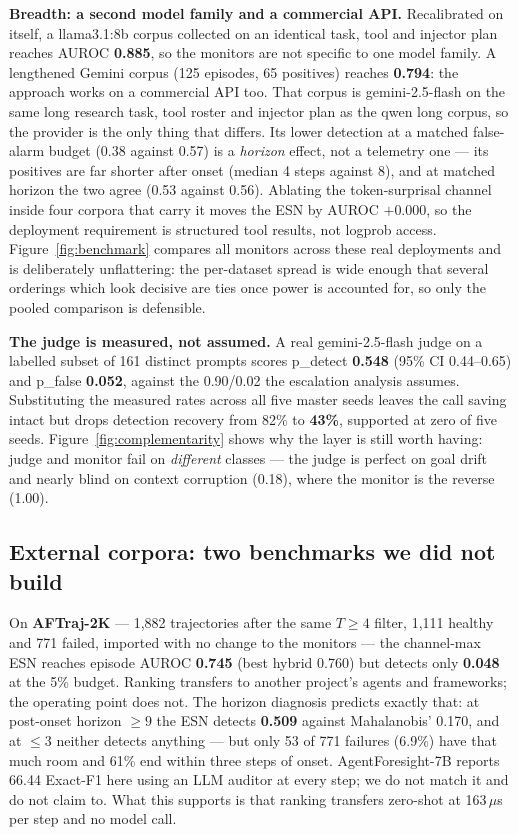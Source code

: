 \documentclass{article}
\begin{document}
\textbf{Breadth: a second model family and a commercial API.} Recalibrated on itself, a llama3.1:8b corpus collected on an identical task, tool and injector plan reaches AUROC \textbf{0.885}, so the monitors are not specific to one model family. A lengthened Gemini corpus (125 episodes, 65 positives) reaches \textbf{0.794}: the approach works on a commercial API too. That corpus is gemini-2.5-flash on the same long research task, tool roster and injector plan as the qwen long corpus, so the provider is the only thing that differs. Its lower detection at a matched false-alarm budget (0.38 against 0.57) is a \emph{horizon} effect, not a telemetry one --- its positives are far shorter after onset (median 4 steps against 8), and at matched horizon the two agree (0.53 against 0.56). Ablating the token-surprisal channel inside four corpora that carry it moves the ESN by AUROC $+0.000$, so the deployment requirement is structured tool results, not logprob access. Figure~\ref{fig:benchmark} compares all monitors across these real deployments and is deliberately unflattering: the per-dataset spread is wide enough that several orderings which look decisive are ties once power is accounted for, so only the pooled comparison is defensible.

\textbf{The judge is measured, not assumed.} A real gemini-2.5-flash judge on a labelled subset of 161 distinct prompts scores p\_detect \textbf{0.548} (95\% CI 0.44--0.65) and p\_false \textbf{0.052}, against the 0.90/0.02 the escalation analysis assumes. Substituting the measured rates across all five master seeds leaves the call saving intact but drops detection recovery from 82\% to \textbf{43\%}, supported at zero of five seeds. Figure~\ref{fig:complementarity} shows why the layer is still worth having: judge and monitor fail on \emph{different} classes --- the judge is perfect on goal drift and nearly blind on context corruption (0.18), where the monitor is the reverse (1.00).

\subsection{External corpora: two benchmarks we did not build}
\label{sec:external}

On \textbf{AFTraj-2K} \cite{zhang2026agentforesight} --- 1,882 trajectories after the same $T\geq4$ filter, 1,111 healthy and 771 failed, imported with no change to the monitors --- the channel-max ESN reaches episode AUROC \textbf{0.745} (best hybrid 0.760) but detects only \textbf{0.048} at the 5\% budget. Ranking transfers to another project's agents and frameworks; the operating point does not. The horizon diagnosis predicts exactly that: at post-onset horizon $\geq9$ the ESN detects \textbf{0.509} against Mahalanobis' 0.170, and at $\leq3$ neither detects anything --- but only 53 of 771 failures (6.9\%) have that much room and 61\% end within three steps of onset. AgentForesight-7B reports 66.44 Exact-F1 here using an LLM auditor at every step; we do not match it and do not claim to. What this supports is that ranking transfers zero-shot at 163\,$\mu$s per step and no model call.
\end{document}
